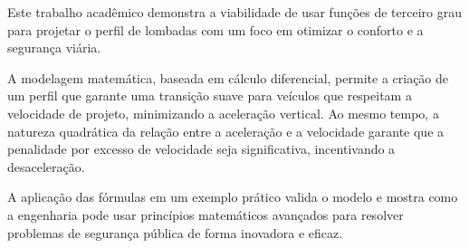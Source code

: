 \documentclass[../resumo.tex]{subfiles}
\begin{document}
	Este trabalho acadêmico demonstra a viabilidade de usar funções de terceiro grau
	para projetar o perfil de lombadas com um foco em otimizar o conforto e a segurança
	viária.

	A modelagem matemática, baseada em cálculo diferencial, permite a criação de
	um perfil que garante uma transição suave para veículos que respeitam a velocidade de
	projeto, minimizando a aceleração vertical. Ao mesmo tempo, a natureza quadrática da
	relação entre a aceleração e a velocidade garante que a penalidade por excesso de velocidade
	seja significativa, incentivando a desaceleração.

	A aplicação das fórmulas em um exemplo prático valida o modelo e mostra como a engenharia
	pode usar princípios matemáticos avançados para resolver problemas de segurança pública
	de forma inovadora e eficaz.
\end{document}
